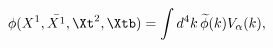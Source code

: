 \begin{equation}
\phi(X^1,\bar{X^1},\Xt^2, \Xtb)=\int d^4k \,\widetilde{\phi}(k)
 V_{\alpha}(k) ,
\end{equation}

